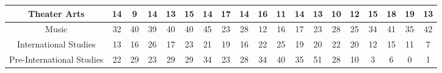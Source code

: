 \documentclass[10]{article}
\begin{document}
\begin{landscape}
\begin{longtable}[c]{|ccccccccccccccccccc|}
	\multicolumn{1}{|c|}{Theater Arts}                               & \multicolumn{1}{c|}{14}         & \multicolumn{1}{c|}{9}          & \multicolumn{1}{c|}{14}         & \multicolumn{1}{c|}{13}         & \multicolumn{1}{c|}{15}         & \multicolumn{1}{c|}{14}         & \multicolumn{1}{c|}{17}         & \multicolumn{1}{c|}{14}         & \multicolumn{1}{c|}{16}         & \multicolumn{1}{c|}{11}         & \multicolumn{1}{c|}{14}         & \multicolumn{1}{c|}{13}         & \multicolumn{1}{c|}{10}         & \multicolumn{1}{c|}{12}         & \multicolumn{1}{c|}{15}         & \multicolumn{1}{c|}{18}         & \multicolumn{1}{c|}{19}         & 13         \\ \hline
	\multicolumn{1}{|c|}{Music}                                      & \multicolumn{1}{c|}{32}         & \multicolumn{1}{c|}{40}         & \multicolumn{1}{c|}{39}         & \multicolumn{1}{c|}{40}         & \multicolumn{1}{c|}{40}         & \multicolumn{1}{c|}{45}         & \multicolumn{1}{c|}{23}         & \multicolumn{1}{c|}{28}         & \multicolumn{1}{c|}{12}         & \multicolumn{1}{c|}{16}         & \multicolumn{1}{c|}{17}         & \multicolumn{1}{c|}{23}         & \multicolumn{1}{c|}{28}         & \multicolumn{1}{c|}{25}         & \multicolumn{1}{c|}{34}         & \multicolumn{1}{c|}{41}         & \multicolumn{1}{c|}{35}         & 42         \\ \hline
	\multicolumn{1}{|c|}{International Studies}                      & \multicolumn{1}{c|}{13}         & \multicolumn{1}{c|}{16}         & \multicolumn{1}{c|}{26}         & \multicolumn{1}{c|}{17}         & \multicolumn{1}{c|}{23}         & \multicolumn{1}{c|}{21}         & \multicolumn{1}{c|}{19}         & \multicolumn{1}{c|}{16}         & \multicolumn{1}{c|}{22}         & \multicolumn{1}{c|}{25}         & \multicolumn{1}{c|}{19}         & \multicolumn{1}{c|}{20}         & \multicolumn{1}{c|}{22}         & \multicolumn{1}{c|}{20}         & \multicolumn{1}{c|}{12}         & \multicolumn{1}{c|}{15}         & \multicolumn{1}{c|}{11}         & 7          \\ \hline
	\multicolumn{1}{|c|}{Pre-International Studies}                  & \multicolumn{1}{c|}{22}         & \multicolumn{1}{c|}{29}         & \multicolumn{1}{c|}{23}         & \multicolumn{1}{c|}{29}         & \multicolumn{1}{c|}{29}         & \multicolumn{1}{c|}{34}         & \multicolumn{1}{c|}{23}         & \multicolumn{1}{c|}{28}         & \multicolumn{1}{c|}{34}         & \multicolumn{1}{c|}{40}         & \multicolumn{1}{c|}{35}         & \multicolumn{1}{c|}{51}         & \multicolumn{1}{c|}{28}         & \multicolumn{1}{c|}{10}         & \multicolumn{1}{c|}{3}          & \multicolumn{1}{c|}{6}          & \multicolumn{1}{c|}{0}          & 1          \\ \hline

\end{longtable}
\end{landscape}
\end{document}

